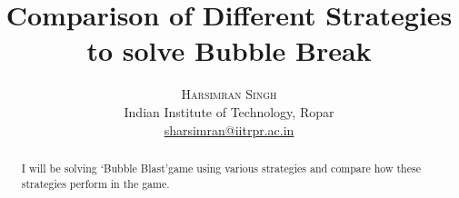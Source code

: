 \documentclass[twoside]{article}
\title{\vspace{-15mm}\fontsize{24pt}{10pt}\selectfont\textbf{Comparison of Different Strategies to solve Bubble Break}} %
\author{
\large
\textsc{Harsimran Singh}\\%
\normalsize Indian Institute of Technology, Ropar \\ %
\normalsize \href{mailto:sharsimran@iitrpr.ac.in}{sharsimran@iitrpr.ac.in} %
\vspace{-5mm}
}
\date{}
\begin{document}
\maketitle %

\thispagestyle{fancy} %


\begin{abstract}

\noindent  %
I will be solving \lq Bubble Blast\rq game using various strategies and compare how
these strategies perform in the game.
\end{abstract}

\end{document}

